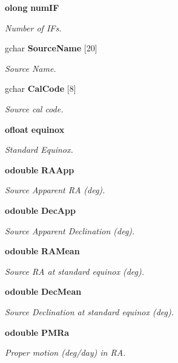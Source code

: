 \begin{CompactItemize}
{\bf olong} {\bf num\-IF}
\begin{CompactList}\small\item\em Number of IFs. \item\end{CompactList}\item 
gchar {\bf Source\-Name} [20]
\begin{CompactList}\small\item\em Source Name. \item\end{CompactList}\item 
gchar {\bf Cal\-Code} [8]
\begin{CompactList}\small\item\em Source cal code. \item\end{CompactList}\item 
{\bf ofloat} {\bf equinox}
\begin{CompactList}\small\item\em Standard Equinox. \item\end{CompactList}\item 
{\bf odouble} {\bf RAApp}
\begin{CompactList}\small\item\em Source Apparent RA (deg). \item\end{CompactList}\item 
{\bf odouble} {\bf Dec\-App}
\begin{CompactList}\small\item\em Source Apparent Declination (deg). \item\end{CompactList}\item 
{\bf odouble} {\bf RAMean}
\begin{CompactList}\small\item\em Source RA at standard equinox (deg). \item\end{CompactList}\item 
{\bf odouble} {\bf Dec\-Mean}
\begin{CompactList}\small\item\em Source Declination at standard equinox (deg). \item\end{CompactList}\item 
{\bf odouble} {\bf PMRa}
\begin{CompactList}\small\item\em Proper motion (deg/day) in RA. \item\end{CompactList}\item 

\end{CompactItemize}
